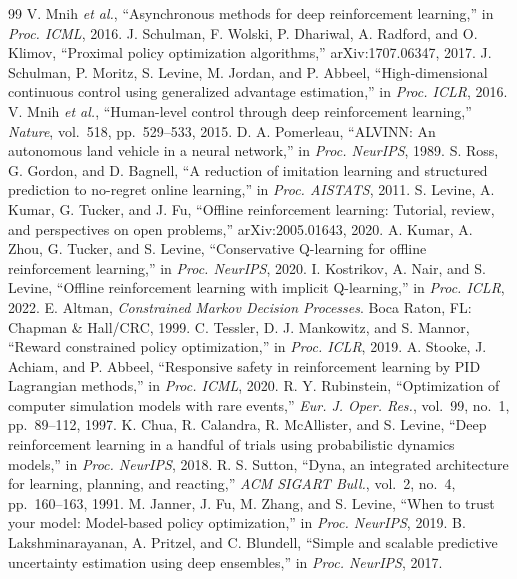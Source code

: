 \documentclass[conference]{IEEEtran}
\begin{document}
\begin{thebibliography}{99}
 V. Mnih \emph{et al.}, ``Asynchronous methods for deep reinforcement learning,'' in \emph{Proc. ICML}, 2016.
 J. Schulman, F. Wolski, P. Dhariwal, A. Radford, and O. Klimov, ``Proximal policy optimization algorithms,'' arXiv:1707.06347, 2017.
 J. Schulman, P. Moritz, S. Levine, M. Jordan, and P. Abbeel, ``High-dimensional continuous control using generalized advantage estimation,'' in \emph{Proc. ICLR}, 2016.
 V. Mnih \emph{et al.}, ``Human-level control through deep reinforcement learning,'' \emph{Nature}, vol.~518, pp.~529--533, 2015.
 D. A. Pomerleau, ``ALVINN: An autonomous land vehicle in a neural network,'' in \emph{Proc. NeurIPS}, 1989.
 S. Ross, G. Gordon, and D. Bagnell, ``A reduction of imitation learning and structured prediction to no-regret online learning,'' in \emph{Proc. AISTATS}, 2011.
 S. Levine, A. Kumar, G. Tucker, and J. Fu, ``Offline reinforcement learning: Tutorial, review, and perspectives on open problems,'' arXiv:2005.01643, 2020.
 A. Kumar, A. Zhou, G. Tucker, and S. Levine, ``Conservative Q-learning for offline reinforcement learning,'' in \emph{Proc. NeurIPS}, 2020.
 I. Kostrikov, A. Nair, and S. Levine, ``Offline reinforcement learning with implicit Q-learning,'' in \emph{Proc. ICLR}, 2022.
 E. Altman, \emph{Constrained Markov Decision Processes}. Boca Raton, FL: Chapman \& Hall/CRC, 1999.
 C. Tessler, D. J. Mankowitz, and S. Mannor, ``Reward constrained policy optimization,'' in \emph{Proc. ICLR}, 2019.
 A. Stooke, J. Achiam, and P. Abbeel, ``Responsive safety in reinforcement learning by PID Lagrangian methods,'' in \emph{Proc. ICML}, 2020.
 R. Y. Rubinstein, ``Optimization of computer simulation models with rare events,'' \emph{Eur. J. Oper. Res.}, vol.~99, no.~1, pp.~89--112, 1997.
 K. Chua, R. Calandra, R. McAllister, and S. Levine, ``Deep reinforcement learning in a handful of trials using probabilistic dynamics models,'' in \emph{Proc. NeurIPS}, 2018.
 R. S. Sutton, ``Dyna, an integrated architecture for learning, planning, and reacting,'' \emph{ACM SIGART Bull.}, vol.~2, no.~4, pp.~160--163, 1991.
 M. Janner, J. Fu, M. Zhang, and S. Levine, ``When to trust your model: Model-based policy optimization,'' in \emph{Proc. NeurIPS}, 2019.
 B. Lakshminarayanan, A. Pritzel, and C. Blundell, ``Simple and scalable predictive uncertainty estimation using deep ensembles,'' in \emph{Proc. NeurIPS}, 2017.

\end{thebibliography}
\end{document}
